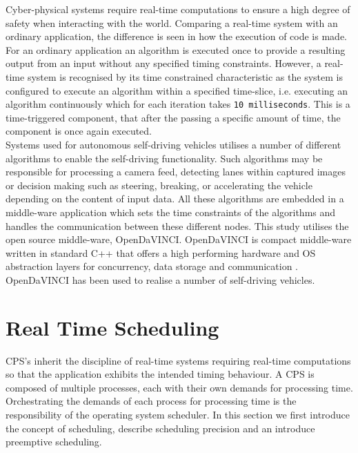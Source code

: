 Cyber-physical systems require real-time computations to ensure a high degree of safety when interacting with the world. Comparing a real-time system with an ordinary application, the difference is seen in how the execution of code is made. For an ordinary application an algorithm is executed once to provide a resulting output from an input without any specified timing constraints. However, a real-time system is recognised by its time constrained characteristic as the system is configured to execute an algorithm within a specified time-slice, i.e. executing an algorithm continuously which for each iteration takes \texttt{10 milliseconds}. This is a time-triggered component, that after the passing a specific amount of time, the component is once again executed. \\

Systems used for autonomous self-driving vehicles utilises a number of different algorithms to enable the self-driving functionality. Such algorithms may be responsible for processing a camera feed, detecting lanes within captured images or decision making such as steering, breaking, or accelerating the vehicle depending on the content of input data. All these algorithms are embedded in a middle-ware application which sets the time constraints of the algorithms and handles the communication between these different nodes. This study utilises the open source middle-ware, OpenDaVINCI. OpenDaVINCI is compact middle-ware written in standard C++ that offers a high performing hardware and OS abstraction layers for concurrency, data storage and communication \cite{OpenDaVINCI}. OpenDaVINCI has been used to realise a number of self-driving vehicles.


\section{Real Time Scheduling}


CPS's inherit the discipline of real-time systems requiring real-time computations so that the application exhibits the intended timing behaviour. A CPS is composed of multiple processes, each with their own demands for processing time. Orchestrating the demands of each process for processing time is the responsibility of the operating system scheduler. In this section we first introduce the concept of scheduling, describe scheduling precision and an introduce preemptive scheduling. 

